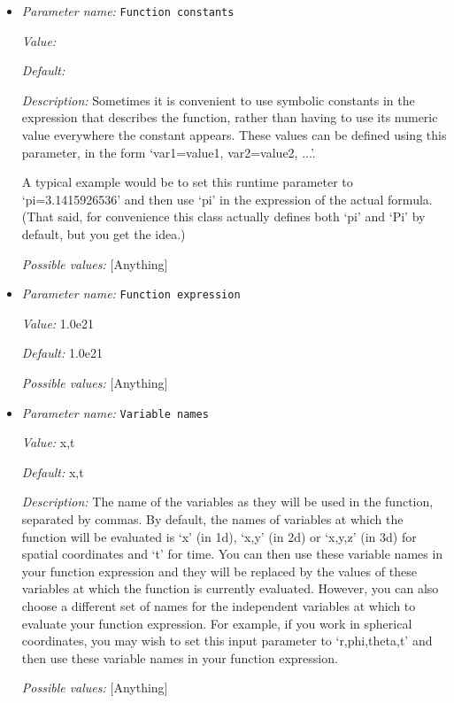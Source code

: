\begin{itemize}
\item {\it Parameter name:} {\tt Function constants}
\label{parameters:Material model/Depth dependent model/Viscosity depth function/Function constants}


{\it Value:} 


{\it Default:} 


{\it Description:} Sometimes it is convenient to use symbolic constants in the expression that describes the function, rather than having to use its numeric value everywhere the constant appears. These values can be defined using this parameter, in the form `var1=value1, var2=value2, ...'.

A typical example would be to set this runtime parameter to `pi=3.1415926536' and then use `pi' in the expression of the actual formula. (That said, for convenience this class actually defines both `pi' and `Pi' by default, but you get the idea.)


{\it Possible values:} [Anything]
\item {\it Parameter name:} {\tt Function expression}
\label{parameters:Material model/Depth dependent model/Viscosity depth function/Function expression}


{\it Value:} 1.0e21


{\it Default:} 1.0e21


{\it Possible values:} [Anything]
\item {\it Parameter name:} {\tt Variable names}
\label{parameters:Material model/Depth dependent model/Viscosity depth function/Variable names}


{\it Value:} x,t


{\it Default:} x,t


{\it Description:} The name of the variables as they will be used in the function, separated by commas. By default, the names of variables at which the function will be evaluated is `x' (in 1d), `x,y' (in 2d) or `x,y,z' (in 3d) for spatial coordinates and `t' for time. You can then use these variable names in your function expression and they will be replaced by the values of these variables at which the function is currently evaluated. However, you can also choose a different set of names for the independent variables at which to evaluate your function expression. For example, if you work in spherical coordinates, you may wish to set this input parameter to `r,phi,theta,t' and then use these variable names in your function expression.


{\it Possible values:} [Anything]
\end{itemize}

